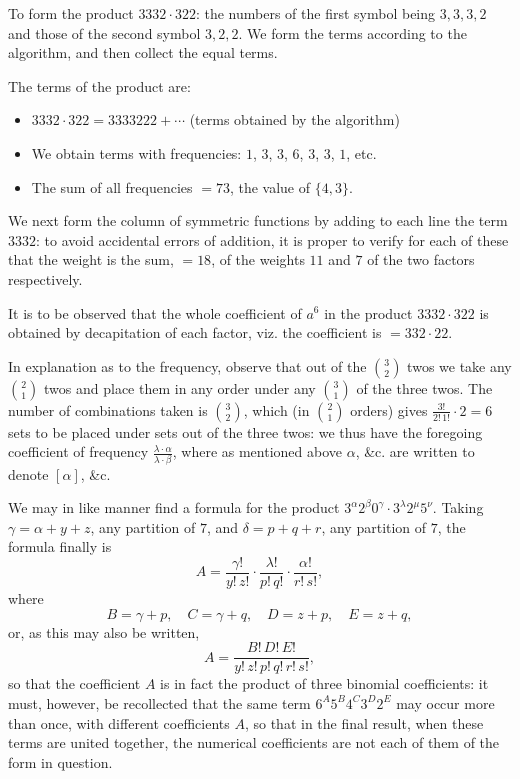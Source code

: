 \documentclass[11pt,a4paper]{book}
\begin{document}
\begin{art}
To form the product $3332 \cdot 322$: the numbers of the first symbol being $3,3,3,2$ and those of the second symbol $3,2,2$. We form the terms according to the algorithm, and then collect the equal terms.

The terms of the product are:
\begin{itemize}[leftmargin=2em]
\item $3332 \cdot 322 = 3333222 + \cdots$ (terms obtained by the algorithm)
\item We obtain terms with frequencies: $1$, $3$, $3$, $6$, $3$, $3$, $1$, etc.
\item The sum of all frequencies $= 73$, the value of $\{4,3\}$.
\end{itemize}
\end{art}

\begin{art}
We next form the column of symmetric functions by adding to each line the term $3332$: to avoid accidental errors of addition, it is proper to verify for each of these that the weight is the sum, $=18$, of the weights $11$ and $7$ of the two factors respectively.

It is to be observed that the whole coefficient of $a^6$ in the product $3332 \cdot 322$ is obtained by decapitation of each factor, viz. the coefficient is $= 332 \cdot 22$.
\end{art}

\begin{art}
In explanation as to the frequency, observe that out of the $\binom{3}{2}$ twos we take any $\binom{2}{1}$ twos and place them in any order under any $\binom{3}{1}$ of the three twos. The number of combinations taken is $\binom{3}{2}$, which (in $\binom{2}{1}$ orders) gives $\frac{3!}{2!\,1!} \cdot 2 = 6$ sets to be placed under sets out of the three twos: we thus have the foregoing coefficient of frequency $\frac{\lambda \cdot \alpha}{\lambda \cdot \beta}$, where as mentioned above $\alpha$, \&c. are written to denote $[\alpha]$, \&c.
\end{art}

\begin{art}
We may in like manner find a formula for the product $3^\alpha 2^\beta 0^\gamma \cdot 3^\lambda 2^\mu 5^\nu$. Taking $\gamma = \alpha + y + z$, any partition of $7$, and $\delta = p + q + r$, any partition of $7$, the formula finally is
\[
A = \frac{\gamma!}{y!\,z!} \cdot \frac{\lambda!}{p!\,q!} \cdot \frac{\alpha!}{r!\,s!},
\]
where
\[
B = \gamma + p, \quad C = \gamma + q, \quad D = z + p, \quad E = z + q,
\]
or, as this may also be written,
\[
A = \frac{B!\,D!\,E!}{y!\,z!\,p!\,q!\,r!\,s!},
\]
so that the coefficient $A$ is in fact the product of three binomial coefficients: it must, however, be recollected that the same term $6^A 5^B 4^C 3^D 2^E$ may occur more than once, with different coefficients $A$, so that in the final result, when these terms are united together, the numerical coefficients are not each of them of the form in question.
\end{art}
\end{document}
